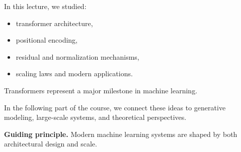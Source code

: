 In this lecture, we studied:

\begin{itemize}
    \item transformer architecture,
    \item positional encoding,
    \item residual and normalization mechanisms,
    \item scaling laws and modern applications.
\end{itemize}

\medskip

\noindent
Transformers represent a major milestone in machine learning.

\medskip

\noindent
In the following part of the course, we connect these ideas to generative modeling, large-scale systems, and theoretical perspectives.

\medskip

\noindent
\textbf{Guiding principle.}  
Modern machine learning systems are shaped by both architectural design and scale.